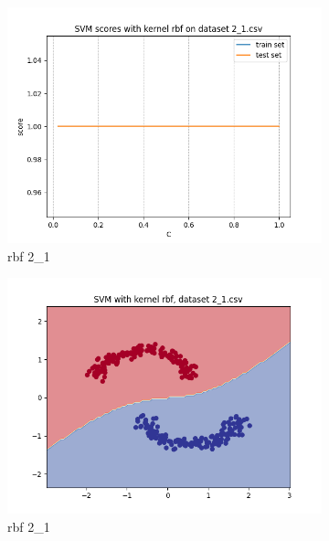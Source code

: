 \documentclass[12pt]{article}
\newcommand*{\subfigwidth}{0.24\textwidth}
\begin{document}
\begin{figure}[H]
\begin{subfigure}[t]{\subfigwidth}
        \includegraphics[width=\linewidth]{img/exp_1/svm/2_1/rbf/scores.png}
        \caption{rbf 2\_1}
    \end{subfigure}
    \hfill
    \begin{subfigure}[t]{\subfigwidth}
        \includegraphics[width=\linewidth]{img/exp_1/svm/2_1/rbf/boundary.png}
        \caption{rbf 2\_1}
    \end{subfigure}
    \\
    \begin{subfigure}[t]{\subfigwidth}

\end{subfigure}
\end{figure}
\end{document}
